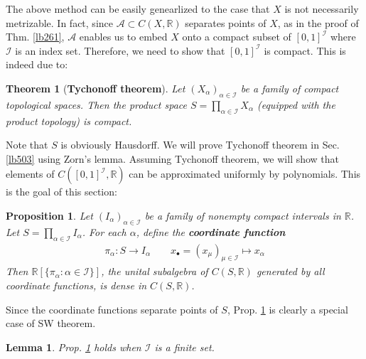 \documentclass[12pt,b5paper,notitlepage]{article}
\theoremstyle{definition}
\theoremstyle{plain}
\newtheorem{thm}[df]{Theorem}
\newtheorem{pp}[df]{Proposition}
\newtheorem{lm}[df]{Lemma}
\newcommand{\scr}{\mathscr}
\newcommand{\blt}{\bullet}
\newcommand{\Rbb}{\mathbb R}
\numberwithin{equation}{section}
\begin{document}
The above method can be easily genearlized to the case that $X$ is not necessarily metrizable. In fact, since $\scr A\subset C(X,\Rbb)$ separates points of $X$, as in the proof of  Thm. \ref{lb261}, $\scr A$ enables us to embed $X$ onto a compact subset of $[0,1]^{\scr I}$ where $\scr I$ is an index set. Therefore, we need to show that $[0,1]^{\scr I}$ is compact. This is indeed due to:


\begin{thm}[\textbf{Tychonoff theorem}]\label{lb452}
Let $(X_\alpha)_{\alpha\in\scr I}$ be a family of compact topological spaces. Then the product space $S=\prod_{\alpha\in\scr I}X_\alpha$ (equipped with the product topology) is compact.
\end{thm}
Note that $S$ is obviously Hausdorff. We will prove Tychonoff theorem in Sec. \ref{lb503} using Zorn's lemma. Assuming Tychonoff theorem, we will show that elements of $C([0,1]^{\scr I},\Rbb)$ can be approximated uniformly by polynomials. This is the goal of this section:


\begin{pp}\label{lb451}
Let $(I_\alpha)_{\alpha\in\scr I}$ be a family of nonempty compact  intervals in $\Rbb$. Let $S=\prod_{\alpha\in\scr I}I_\alpha$. For each $\alpha$, define the \textbf{coordinate function}
\begin{align*}
\pi_\alpha:S\rightarrow I_\alpha\qquad x_\blt=(x_\mu)_{\mu\in\scr I}\mapsto x_\alpha
\end{align*}
Then $\Rbb[\{\pi_\alpha:\alpha\in\scr I\}]$, the unital subalgebra of $C(S,\Rbb)$ generated by all coordinate functions, is dense in $C(S,\Rbb)$.
\end{pp}


Since the coordinate functions separate points of $S$, Prop. \ref{lb451} is clearly a special case of SW theorem. %


\begin{lm}\label{lb456}
Prop. \ref{lb451} holds when $\scr I$ is a finite set.
\end{lm}
\end{document}
